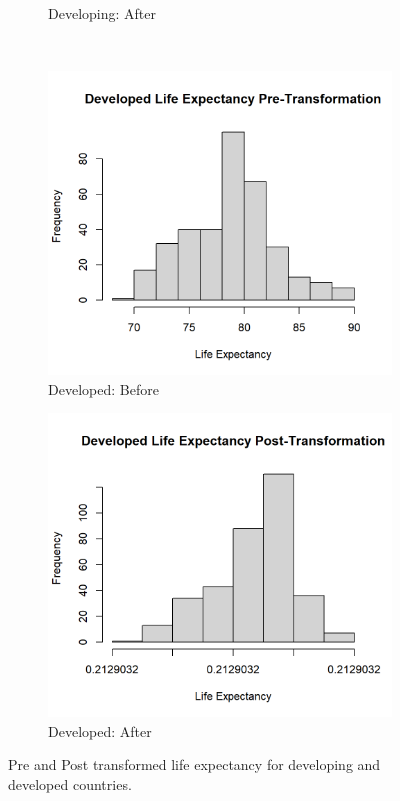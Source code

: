 \documentclass[12pt]{article}
\begin{document}
\begin{figure}[h]
\begin{subfigure}{0.5\textwidth}
    \caption{Developing: After}
    \label{subfig:image2}
  \end{subfigure}\\[1em]
  \begin{subfigure}{0.5\textwidth}
    \centering
    \includegraphics[width=\linewidth]{images/figure_4c.png}
    \caption{Developed: Before}
    \label{subfig:image3}
  \end{subfigure}%
  \begin{subfigure}{0.5\textwidth}
    \centering
    \includegraphics[width=\linewidth]{images/figure_4d.png}
    \caption{Developed: After}
    \label{subfig:image4}
  \end{subfigure}
  \caption{Pre and Post transformed life expectancy for developing and developed countries.}
  \label{fig:figure_4}
\end{figure}
\end{document}
